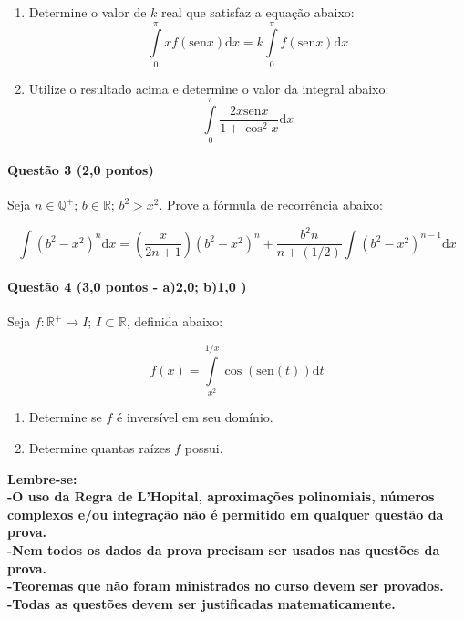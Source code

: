\documentclass[12pt,a4paper]{article}
\newcommand{\sen}{\mathrm{sen}}
\newcommand{\dd}{\mathrm{d}}
\begin{document}
\begin{enumerate}[label=(\alph*)]
    \item Determine o valor de $k$ real que satisfaz a equação abaixo:
    $$ \displaystyle\int\limits_{0}^{\pi} x f(\sen{x}) \dd x = k \displaystyle\int\limits_{0}^{\pi} f(\sen{x}) \dd x$$

    \item Utilize o resultado acima e determine o valor da integral abaixo: 
    $$ \displaystyle\int\limits_{0}^{\pi} \dfrac{2x \sen{x}}{1 + \cos^2{x}} \dd x$$    
\end{enumerate}

\paragraph{Questão 3 (2,0 pontos)}

Seja $n \in \mathbb{Q^{+}}$; $b \in \mathbb{R}$; $b^2 > x^2$. Prove a fórmula de recorrência abaixo:

$$\displaystyle\int (b^2 - x^2)^n \dd x = \left ( \dfrac{x}{2n + 1} \right )(b^2 - x^2)^n + \dfrac{b^2n}{n + (1/2)} \displaystyle\int(b^2 - x^2)^{n-1} \dd x $$


\paragraph{Questão 4 (3,0 pontos - a)2,0; b)1,0 ) }


Seja $f:\mathbb{R^+} \rightarrow I$; $I \subset \mathbb{R}$, definida abaixo:

$$f(x) = \displaystyle\int\limits_{x^2}^{1/x} \cos{(\sen{(t)})} \dd t$$


\begin{enumerate}[label=(\alph*)]
    \item Determine se $f$ é inversível em seu domínio.
    \item Determine quantas raízes $f$ possui.

\end{enumerate}

\noindent \textbf{Lembre-se: \\ -O uso da Regra de L'Hopital, aproximações polinomiais, números complexos e/ou integração não é permitido em qualquer questão da prova. \\ -Nem todos os dados da prova precisam ser usados nas questões da prova. \\ -Teoremas que não foram ministrados no curso devem ser provados. \\ -Todas as questões devem ser justificadas matematicamente.}
 \newpage
\end{document}
